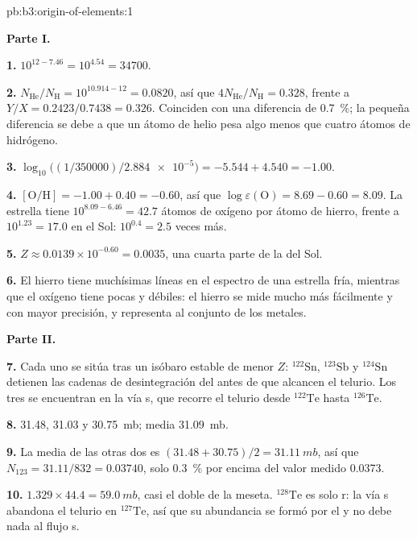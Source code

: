 \begin{solution}{pb:b3:origin-of-elements:1}

\textbf{Parte I.}

\textbf{1.} $10^{12 - 7.46} = 10^{4.54} = \num{34700}$.

\textbf{2.} $N_\mathrm{He}/N_\mathrm{H} = 10^{10.914 - 12} = \num{0.0820}$, así que
$4N_\mathrm{He}/N_\mathrm{H} = \num{0.328}$, frente a $Y/X =
0.2423/0.7438 = \num{0.326}$. Coinciden con una diferencia de \qty{0.7}{\percent}; la
pequeña diferencia se debe a que un átomo de helio pesa algo menos que cuatro
átomos de hidrógeno.

\textbf{3.} $\log_{10}\bigl((1/350000)/\num{2.884e-5}\bigr) = -5.544 + 4.540 =
-1.00$.

\textbf{4.} $[\mathrm{O/H}] = -1.00 + 0.40 = -0.60$, así que
$\log\varepsilon(\mathrm{O}) = 8.69 - 0.60 = 8.09$. La estrella tiene
$10^{8.09 - 6.46} = 42.7$ átomos de oxígeno por átomo de hierro, frente a
$10^{1.23} = 17.0$ en el Sol: $10^{0.4} = 2.5$ veces más.

\textbf{5.} $Z \approx 0.0139\times10^{-0.60} = \num{0.0035}$, una cuarta parte de la
del Sol.

\textbf{6.} El hierro tiene muchísimas líneas en el espectro de una estrella fría, mientras que
el oxígeno tiene pocas y débiles: el hierro se mide mucho más fácilmente y
con mayor precisión, y representa al conjunto de los metales.

\textbf{Parte II.}

\textbf{7.} Cada uno se sitúa tras un isóbaro estable de menor $Z$:
$^{122}\mathrm{Sn}$, $^{123}\mathrm{Sb}$ y $^{124}\mathrm{Sn}$ detienen
las cadenas de desintegración del  antes de que alcancen el telurio. Los tres se
encuentran en la vía s, que recorre el telurio desde $^{122}\mathrm{Te}$ hasta
$^{126}\mathrm{Te}$.

\textbf{8.} \num{31.48}, \num{31.03} y \qty{30.75}{mb}; media
\qty{31.09}{mb}.

\textbf{9.} La media de las otras dos es $(31.48 + 30.75)/2 = \qty{31.11}{mb}$,
así que $N_{123} = 31.11/832 = \num{0.03740}$, solo \qty{0.3}{\percent}
por encima del valor medido \num{0.0373}.

\textbf{10.} $1.329\times44.4 = \qty{59.0}{mb}$, casi el doble de la meseta.
$^{128}\mathrm{Te}$ es solo r: la vía s abandona el telurio en
$^{127}\mathrm{Te}$, así que su abundancia se formó por el  y
no debe nada al flujo s.


\end{solution}
